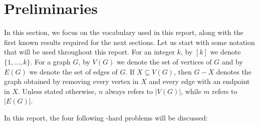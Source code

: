 \section{Preliminaries}
\label{section:preliminaries}

In this section, we focus on the vocabulary used in this report, along with the first known results required for the next sections. Let us start with some notation that will be used throughout this report. For an integer $k$, by $[k]$ we denote $\{1, \dots, k\}$. For a graph $G$, by $V(G)$ we denote the set of vertices of $G$ and by $E(G)$ we denote the set of edges of $G$. If $X \subseteq V(G)$, then $G - X$ denotes the graph obtained by removing every vertex in $X$ and every edge with an endpoint in $X$. Unless stated otherwise, $n$ always refers to $|V(G)|$, while $m$ refers to $|E(G)|$. 

\medskip

In this report, the four following \NP-hard problems will be discussed:

\begin{problem}
\end{problem}

\begin{problem}
\end{problem}

\begin{problem}
\end{problem}


